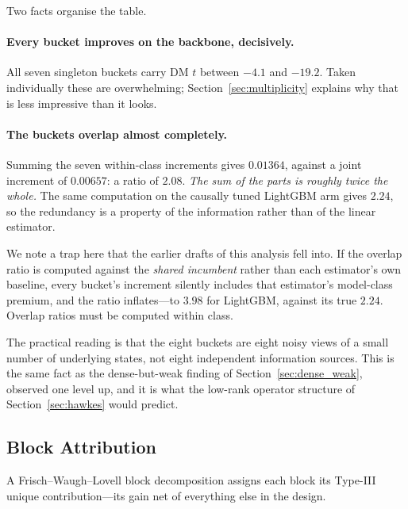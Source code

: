 Two facts organise the table.

\paragraph{Every bucket improves on the backbone, decisively.} All seven
singleton buckets carry DM $t$ between $-4.1$ and $-19.2$. Taken individually
these are overwhelming; Section~\ref{sec:multiplicity} explains why that is
less impressive than it looks.

\paragraph{The buckets overlap almost completely.} Summing the seven
within-class increments gives $0.01364$, against a joint increment of
$0.00657$: a ratio of $2.08$. \emph{The sum of the parts is roughly twice the
whole.} The same computation on the causally tuned LightGBM arm gives $2.24$,
so the redundancy is a property of the information rather than of the linear
estimator.

We note a trap here that the earlier drafts of this analysis fell into. If the
overlap ratio is computed against the \emph{shared incumbent} rather than each
estimator's own baseline, every bucket's increment silently includes that
estimator's model-class premium, and the ratio inflates---to $3.98$ for
LightGBM, against its true $2.24$. Overlap ratios must be computed within
class.

The practical reading is that the eight buckets are eight noisy views of a
small number of underlying states, not eight independent information sources.
This is the same fact as the dense-but-weak finding of
Section~\ref{sec:dense_weak}, observed one level up, and it is what the
low-rank operator structure of Section~\ref{sec:hawkes} would predict.

\subsection{Block Attribution}
\label{sec:fwl}

A Frisch--Waugh--Lovell block decomposition assigns each block its Type-III
unique contribution---its gain net of everything else in the design.

